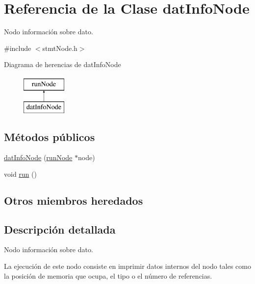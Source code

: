 \hypertarget{classdatInfoNode}{\section{Referencia de la Clase dat\-Info\-Node}
\label{classdatInfoNode}
}


Nodo información sobre dato.  




{\ttfamily \#include $<$stmt\-Node.\-h$>$}

Diagrama de herencias de dat\-Info\-Node\begin{figure}[H]
\begin{center}
\leavevmode
\includegraphics[height=2.000000cm]{classdatInfoNode}
\end{center}
\end{figure}
\subsection*{Métodos públicos}
\begin{DoxyCompactItemize}
\item 
\hyperlink{classdatInfoNode_a40adb798bbeb6f9fa4fdcfbd21086bea}{dat\-Info\-Node} (\hyperlink{classrunNode}{run\-Node} $\ast$node)
\item 
void \hyperlink{classdatInfoNode_a681d40c5a8d3b567da3c167a1c701e59}{run} ()
\end{DoxyCompactItemize}
\subsection*{Otros miembros heredados}


\subsection{Descripción detallada}
Nodo información sobre dato. 

La ejecución de este nodo consiste en imprimir datos internos del nodo tales como la posición de memoria que ocupa, el tipo o el número de referencias. 

